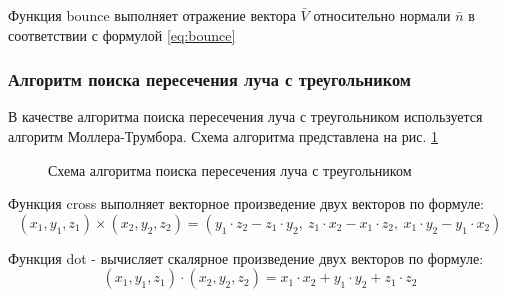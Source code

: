 \documentclass[a4paper, 14pt]{report}
\begin{document}
	Функция bounce выполняет отражение вектора $\bar V$ относительно нормали $\bar n$ в соответствии с формулой \ref{eq:bounce}

	\subsubsection{Алгоритм поиска пересечения луча с треугольником}
	В качестве алгоритма поиска пересечения луча с треугольником используется алгоритм Моллера-Трумбора\cite{mollertrumbor}. Схема алгоритма представлена на рис. \ref{fig:triangle_intersec}
	\begin{figure}[!ht]
		\caption{Схема алгоритма поиска пересечения луча с треугольником}
		\label{fig:triangle_intersec}
	\end{figure}

	Функция cross выполняет векторное произведение двух векторов по формуле:
	\begin{equation}
		(x_1, y_1, z_1)\times(x_2, y_2, z_2)=(y_1\cdot z_2-z_1\cdot y_2,~z_1\cdot x_2-x_1\cdot z_2,~x_1\cdot y_2-y_1\cdot x_2)
	\end{equation}
	
	Функция dot - вычисляет скалярное произведение двух векторов по формуле:
	\begin{equation}
		(x_1, y_1, z_1)\cdot(x_2, y_2, z_2) = x_1\cdot x_2+y_1\cdot y_2+z_1\cdot z_2
	\end{equation}
\end{document}
